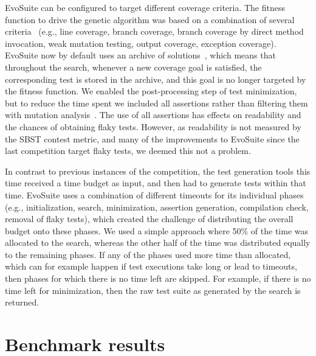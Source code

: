 \documentclass[10pt,conference]{IEEEtran}
\newcommand{\EVOSUITE}{{\sc EvoSuite}\xspace}
\begin{document}
\EVOSUITE can be configured to target different coverage criteria. The
fitness function to drive the genetic algorithm was based on a
combination of several criteria~\cite{rojas2015combining} (e.g., line
coverage, branch coverage, branch coverage by direct method
invocation, weak mutation testing, output coverage, exception
coverage). \EVOSUITE now by default uses an archive of
solutions~\cite{emse_archive}, which means that throughout the search,
whenever a new coverage goal is satisfied, the corresponding test is
stored in the archive, and this goal is no longer targeted by the
fitness function. We enabled the post-processing step of test
minimization, but to reduce the time spent we included all assertions
rather than filtering them with mutation
analysis~\cite{10.1109/TSE.2011.93}. The use of all assertions has
effects on readability and the chances of obtaining flaky
tests. However, as readability is not measured by the SBST contest
metric, and many of the improvements to \EVOSUITE since the last
competition target flaky tests, we deemed this not a problem.

In contrast to previous instances of the competition, the test
generation tools this time received a time budget as input, and then
had to generate tests within that time. \EVOSUITE uses a combination
of different timeouts for its individual phases (e.g., initialization,
search, minimization, assertion generation, compilation check, removal
of flaky tests), which created the challenge of distributing the
overall budget onto these phases. We used a simple approach where 50\%
of the time was allocated to the search, whereas the other half of the
time was distributed equally to the remaining phases. If any of the
phases used more time than allocated, which can for example happen if
test executions take long or lead to timeouts, then phases for which
there is no time left are skipped. For example, if there is no time
left for minimization, then the raw test suite as generated by the
search is returned.

\section{Benchmark results}

% 
\end{document}
